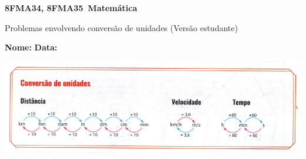 \documentclass[a4paper,14pt]{article}
\begin{document}
	
	\noindent\textbf{8FMA34, 8FMA35~Matemática} 
	
	\begin{center}Problemas envolvendo conversão de unidades (Versão estudante)
	\end{center}
	
	\noindent\textbf{Nome:} \underline{\hspace{10cm}}
	\noindent\textbf{Data:} \underline{\hspace{4cm}}
	
	
    \includegraphics[width=1\linewidth]{8FMA34_imagens/imagem1}
\end{document}
